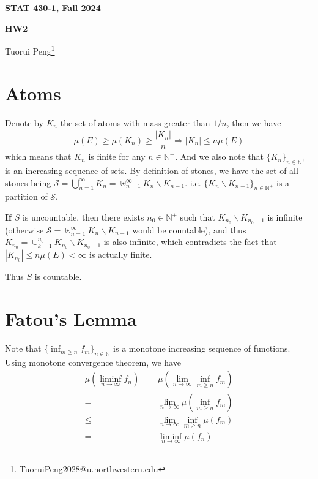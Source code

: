 \documentclass[11pt,a4paper]{article}
\numberwithin{equation}{section}%
\begin{document}
\begin{center}\thispagestyle{plain}

{\LARGE\textbf{STAT 430-1, Fall 2024}}

{\Large\textbf{HW2}}

Tuorui Peng\footnote{TuoruiPeng2028@u.northwestern.edu}
\end{center}

\thispagestyle{myheadings}
\pagestyle{myheadings}

\setcounter{tocdepth}{1}
\tableofcontents


  

\section{Atoms}


Denote by $ K_n $ the set of atoms with mass greater than $ 1/n $, then we have
\begin{align*}
     \mu (E)  \geq \mu (K_n) \geq \dfrac{ \left\vert K_n \right\vert  }{ n }  \Rightarrow \left\vert K_n \right\vert\leq n\mu (E)
\end{align*}
which means that $ K_n $ is finite for any $ n\in\mathbb{N}^+ $. And we also note that $ \{K_n\}_{n\in\mathbb{N}^+} $ is an increasing sequence of sets. By definition of stones, we have the set of all stones being $ \mathcal{S}=\bigcup_{n=1}^{\infty}K_n = \uplus_{n=1}^{\infty}K_n\backslash K_{n-1} $. i.e. $ \{K_n\backslash K_{n-1}\}_{n\in\mathbb{N}^+} $ is a partition of $ \mathcal{S} $.

\textbf{If} $ S $ is uncountable, then there exists $ n_0\in\mathbb{N}^+ $ such that $ K_{n_0}\backslash K_{n_0-1} $ is infinite (otherwise $ \mathcal{S} = \uplus_{n=1}^{\infty}K_n\backslash K_{n-1} $ would be countable), and thus $ K_{n_0} = \cup_{k=1}^{n_0} K_{n_0}\backslash K_{n_0-1} $ is also infinite, which contradicts the fact that $ \left\vert K_{n_0} \right\vert \leq n \mu (E) <\infty $ is actually finite.

Thus $ S $ is countable.


\section{Fatou's Lemma}

Note that $ \{\inf_{m\geq n}f_m\}_{n\in\mathbb{N}} $ is a monotone increasing sequence of functions. Using monotone convergence theorem, we have
\begin{align*}
    \mu \left(\mathop{ \lim\inf }\limits_{n\to\infty } f_n \right)  = & \mu \left( \mathop{ \lim }\limits_{n\to\infty } \inf_{m\geq n} f_m \right)\\
    = & \lim_{n\to\infty } \mu \left( \inf_{m\geq n} f_m \right)\\
    \leq & \lim_{n\to\infty } \inf_{m\geq n} \mu (f_m)\\
    = & \mathop{ \lim\inf  }\limits_{n\to\infty} \mu (f_n) 
\end{align*}
\end{document}
